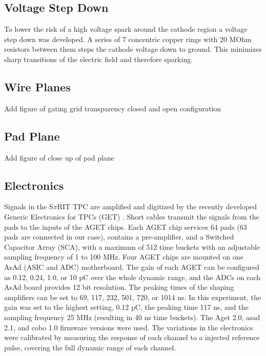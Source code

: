 \subsection{Voltage Step Down}

To lower the risk of a high voltage spark around the cathode region a voltage step down was developed. A series of 7 concentric copper rings with 20 MOhm resistors between them steps the cathode voltage down to ground. This minimizes sharp transitions of the electric field and therefore sparking. 

\subsection{Wire Planes}
Add figure of gating grid transparency closed and open configuration 


\subsection{Pad Plane}
Add figure of close up of pad plane 

\subsection{Electronics}

Signals in the S$\pi$RIT TPC are amplified and digitized by the recently developed Generic Electronics for TPCs (GET) \cite{get}.  Short cables transmit the signals from the pads to the inputs of the AGET chips. Each AGET chip services 64 pads (63 pads are connected in our case), contains a pre-amplifier, and a Switched Capacitor Array (SCA), with a maximum of 512 time buckets with an adjustable sampling frequency of 1 to 100 MHz. Four AGET chips are mounted on one AsAd (ASIC and ADC) motherboard. The gain of each AGET can be configured as 0.12, 0.24, 1.0, or 10 pC over the whole dynamic range, and the ADCs on each AsAd board provides 12 bit resolution. The peaking times of the shaping amplifiers can be set to 69, 117, 232, 501, 720, or 1014 ns. In this experiment, the gain was set to the highest setting, 0.12 pC, the peaking time 117 ns, and the sampling frequency 25 MHz (resulting in 40 ns time buckets). The Aget 2.0, asad 2.1, and cobo 1.0 firmware versions were used. The variations in the electronics were calibrated by measuring the response of each channel to a injected reference pulse, covering the full dynamic range of each channel. 

